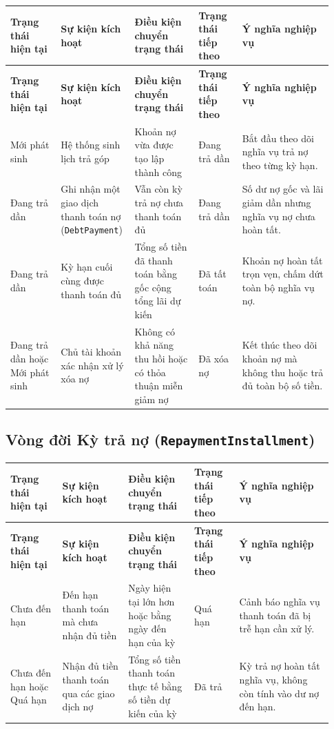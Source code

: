\documentclass[11pt,a4paper]{article}
\newcommand{\code}[1]{\texttt{#1}}
\newcommand{\lthead}[1]{%
  \hline#1\\\hline\endfirsthead
  \hline#1\\\hline\endhead
}
\newenvironment{smalltable}{\begingroup\footnotesize\renewcommand{\arraystretch}{1.25}\setlength{\tabcolsep}{3pt}}{\endgroup}
\begin{document}
\begin{smalltable}
\begin{longtable}{|L{0.15\linewidth}|L{0.19\linewidth}|L{0.19\linewidth}|L{0.13\linewidth}|L{0.27\linewidth}|}
\lthead{\textbf{Trạng thái hiện tại} & \textbf{Sự kiện kích hoạt} & \textbf{Điều kiện chuyển trạng thái} & \textbf{Trạng thái tiếp theo} & \textbf{Ý nghĩa nghiệp vụ}}
Mới phát sinh & Hệ thống sinh lịch trả góp & Khoản nợ vừa được tạo lập thành công & Đang trả dần & Bắt đầu theo dõi nghĩa vụ trả nợ theo từng kỳ hạn. \\ \hline
Đang trả dần & Ghi nhận một giao dịch thanh toán nợ (\code{DebtPayment}) & Vẫn còn kỳ trả nợ chưa thanh toán đủ & Đang trả dần & Số dư nợ gốc và lãi giảm dần nhưng nghĩa vụ nợ chưa hoàn tất. \\ \hline
Đang trả dần & Kỳ hạn cuối cùng được thanh toán đủ & Tổng số tiền đã thanh toán bằng gốc cộng tổng lãi dự kiến & Đã tất toán & Khoản nợ hoàn tất trọn vẹn, chấm dứt toàn bộ nghĩa vụ nợ. \\ \hline
Đang trả dần hoặc Mới phát sinh & Chủ tài khoản xác nhận xử lý xóa nợ & Không có khả năng thu hồi hoặc có thỏa thuận miễn giảm nợ & Đã xóa nợ & Kết thúc theo dõi khoản nợ mà không thu hoặc trả đủ toàn bộ số tiền. \\ \hline
\end{longtable}
\end{smalltable}

\subsection{Vòng đời Kỳ trả nợ (\texttt{RepaymentInstallment})}

\begin{smalltable}
\begin{longtable}{|L{0.15\linewidth}|L{0.19\linewidth}|L{0.19\linewidth}|L{0.13\linewidth}|L{0.27\linewidth}|}
\lthead{\textbf{Trạng thái hiện tại} & \textbf{Sự kiện kích hoạt} & \textbf{Điều kiện chuyển trạng thái} & \textbf{Trạng thái tiếp theo} & \textbf{Ý nghĩa nghiệp vụ}}
Chưa đến hạn & Đến hạn thanh toán mà chưa nhận đủ tiền & Ngày hiện tại lớn hơn hoặc bằng ngày đến hạn của kỳ & Quá hạn & Cảnh báo nghĩa vụ thanh toán đã bị trễ hạn cần xử lý. \\ \hline
Chưa đến hạn hoặc Quá hạn & Nhận đủ tiền thanh toán qua các giao dịch nợ & Tổng số tiền thanh toán thực tế bằng số tiền dự kiến của kỳ & Đã trả & Kỳ trả nợ hoàn tất nghĩa vụ, không còn tính vào dư nợ đến hạn. \\ \hline
\end{longtable}
\end{smalltable}
\end{document}

